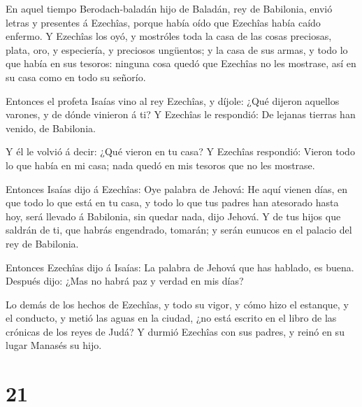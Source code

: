 En aquel tiempo Berodach-baladán hijo de Baladán, rey de
Babilonia, envió letras y presentes á Ezechîas, porque había oído que
Ezechîas había caído enfermo.  Y Ezechîas los oyó, y
mostróles toda la casa de las cosas preciosas, plata, oro, y especiería,
y preciosos ungüentos; y la casa de sus armas, y todo lo que había en
sus tesoros: ninguna cosa quedó que Ezechîas no les mostrase, así en su
casa como en todo su señorío.

 Entonces el profeta Isaías vino al rey Ezechîas, y díjole:
¿Qué dijeron aquellos varones, y de dónde vinieron á ti? Y Ezechîas le
respondió: De lejanas tierras han venido, de Babilonia.

 Y él le volvió á decir: ¿Qué vieron en tu casa? Y Ezechîas
respondió: Vieron todo lo que había en mi casa; nada quedó en mis
tesoros que no les mostrase.

 Entonces Isaías dijo á Ezechîas: Oye palabra de Jehová:
 He aquí vienen días, en que todo lo que está en tu casa, y
todo lo que tus padres han atesorado hasta hoy, será llevado á
Babilonia, sin quedar nada, dijo Jehová.  Y de tus hijos
que saldrán de ti, que habrás engendrado, tomarán; y serán eunucos en el
palacio del rey de Babilonia.

 Entonces Ezechîas dijo á Isaías: La palabra de Jehová que
has hablado, es buena. Después dijo: ¿Mas no habrá paz y verdad en mis
días?

 Lo demás de los hechos de Ezechîas, y todo su vigor, y
cómo hizo el estanque, y el conducto, y metió las aguas en la ciudad,
¿no está escrito en el libro de las crónicas de los reyes de Judá?
 Y durmió Ezechîas con sus padres, y reinó en su lugar
Manasés su hijo.

\hypertarget{section-20}{%
\section{21}\label{section-20}}

